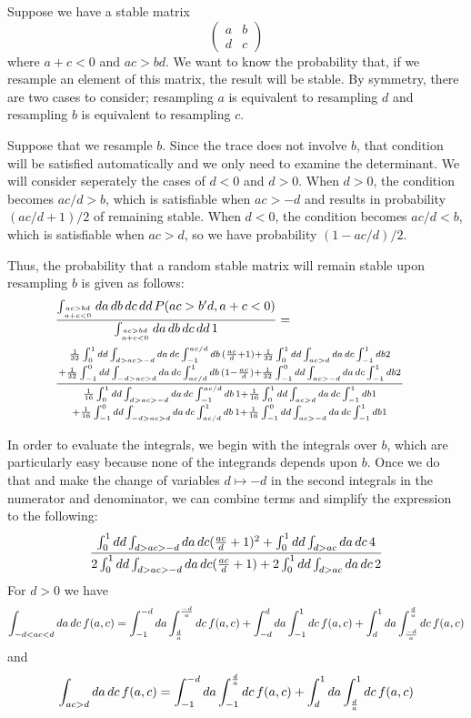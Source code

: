 \documentclass{amsart}
\theoremstyle{definition}
\theoremstyle{remark}
\numberwithin{equation}{section}
\begin{document}
Suppose we have a stable matrix
$$
\begin{pmatrix}
a & b \\
d & c
\end{pmatrix}
$$
where $a + c < 0$ and $ac > bd$.  We want to know the probability
that, if we resample an element of this matrix, the result will be
stable.  By symmetry, there are two cases to consider; resampling 
$a$ is equivalent to resampling $d$ and resampling $b$ is equivalent
to resampling $c$.

Suppose that we resample $b$.  Since the trace does not involve $b$,
that condition will be satisfied automatically and we only need to
examine the determinant.  We will consider seperately the cases of $d
< 0$ and $d > 0$.  When $d > 0$, the condition becomes $ac/d > b$,
which is satisfiable when $ac > -d$ and results in probability $(ac/d
+ 1)/2$ of remaining stable.  When $d < 0$, the condition becomes
$ac/d < b$, which is satisfiable when $ac > d$, so we have probability
$(1 - ac/d)/2$.

Thus, the probability that a random stable matrix will remain stable
upon resampling $b$ is given as follows:
\begin{align*}
&{\int_{ac>bd \atop a+c<0} da\,db\,dc\,dd\,
  P(ac>b'd, a+c < 0) \over
\int_{ac>bd \atop a+c<0} da\,db\,dc\,dd\,1} = \cr
&{{{1 \over 32} \int_0^1 dd \int_{d > ac > -d} da\,dc \int_{-1}^{ac/d} db \,
({ac \over d} + 1) + {1 \over 32} \int_{0}^{1} dd \int_{ac>d} da\,dc \int_{-1}^{1} db 2 \atop + 
{1 \over 32} \int_{-1}^0 dd \int_{-d > ac > d} da\,dc \int_{ac/d}^1 db\, (1
- {ac \over d}) + {1 \over 32} \int_{-1}^{0} dd \int_{ac>-d} da\,dc \int_{-1}^{1} db 2}
\over
{{{1 \over 16} \int_0^1 dd \int_{d > ac > -d} da\,dc \int_{-1}^{ac/d} db\,1
+ {1 \over 16} \int_{0}^{1} dd \int_{ac>d} da\,dc \int_{-1}^{1} db 1} \atop
{+ {1 \over 16} \int_{-1}^0 dd \int_{-d > ac > d} da\,dc \int_{ac/d}^1 db\,1} + {1 \over 16} \int_{-1}^{0} dd \int_{ac>-d} da\,dc \int_{-1}^{1} db 1}}
\end{align*}

In order to evaluate the integrals, we begin with the
integrals over $b$, which are particularly easy because none of the
integrands depends upon $b$.  Once we do that and make the change of
variables $d \mapsto -d$ in the second integrals in the numerator and
denominator, we can combine terms and simplify the expression to the
following:
$$
{\int_0^1 dd \int_{d > ac > -d} da\,dc ({ac \over d} + 1)^2 + \int_0^1 dd \int_{d > ac} da\,dc\, 4 \over
{2 \int_0^1 dd \int_{d > ac > -d} da\,dc ({ac \over d} + 1)} + 2 \int_0^1 dd \int_{d > ac} da\,dc\, 2}
$$
For $d > 0$ we have
$$
\int_{-d<ac<d} da\,dc \, f(a,c) = \int_{-1}^{-d} da \int_{d \over a}^{- d \over a} dc \, f(a,c) + \int_{-d}^{d} da \int_{-1}^{1} dc \, f(a,c) + \int_{d}^{1} da \int_{-d \over a}^{d \over a} dc \, f(a,c) 
$$
and 
$$
\int_{ac>d} da\,dc \, f(a,c) = \int_{-1}^{-d} da \int_{-1}^{d \over a} dc \, f(a,c) + \int_{d}^{1} da \int_{d \over a}^1 dc \, f(a,c)$$
\end{document}
